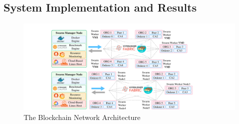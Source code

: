 



\subsection{System Implementation and Results}
\label{sec:results}

\begin{figure}[htbp]
    \centering
    \includegraphics[width=0.99\textwidth]{Figures/ICC-vms1.pdf}
    \caption{The Blockchain Network Architecture}
    \label{fig:Arcitecture}
\end{figure}



